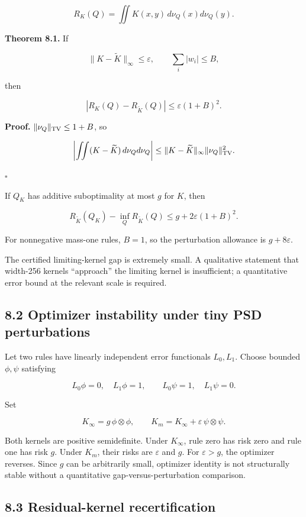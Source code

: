 \documentclass[
  10pt,
]{article}
\begin{document}
\[
R_K(Q)=\iint K(x,y)\,d\nu_Q(x)d\nu_Q(y).
\]

\textbf{Theorem 8.1.} If

\[
\|K-\widetilde K\|_\infty\le\varepsilon,
\qquad
\sum_i|w_i|\le B,
\]

then

\[
|R_K(Q)-R_{\widetilde K}(Q)|
\le
\varepsilon(1+B)^2.
\]

\textbf{Proof.} \(\|\nu_Q\|_{\rm TV}\le1+B\), so

\[
\left|\iint(K-\widetilde K)\,d\nu_Qd\nu_Q\right|
\le
\|K-\widetilde K\|_\infty\|\nu_Q\|_{\rm TV}^2.
\]

\(\square\)

If \(Q_K\) has additive suboptimality at most \(g\) for \(K\), then

\[
R_{\widetilde K}(Q_K)-\inf_QR_{\widetilde K}(Q)
\le
 g+2\varepsilon(1+B)^2.
\]

For nonnegative mass-one rules, \(B=1\), so the perturbation allowance
is \(g+8\varepsilon\).

The certified limiting-kernel gap is extremely small. A qualitative
statement that width-256 kernels ``approach'' the limiting kernel is
insufficient; a quantitative error bound at the relevant scale is
required.

\subsection{8.2 Optimizer instability under tiny PSD
perturbations}\label{optimizer-instability-under-tiny-psd-perturbations}

Let two rules have linearly independent error functionals \(L_0,L_1\).
Choose bounded \(\phi,\psi\) satisfying

\[
L_0\phi=0,
\quad L_1\phi=1,
\qquad
L_0\psi=1,
\quad L_1\psi=0.
\]

Set

\[
K_\infty=g\,\phi\otimes\phi,
\qquad
K_m=K_\infty+\varepsilon\,\psi\otimes\psi.
\]

Both kernels are positive semidefinite. Under \(K_\infty\), rule zero
has risk zero and rule one has risk \(g\). Under \(K_m\), their risks
are \(\varepsilon\) and \(g\). For \(\varepsilon>g\), the optimizer
reverses. Since \(g\) can be arbitrarily small, optimizer identity is
not structurally stable without a quantitative gap-versus-perturbation
comparison.

\subsection{8.3 Residual-kernel
recertification}\label{residual-kernel-recertification}
\end{document}
